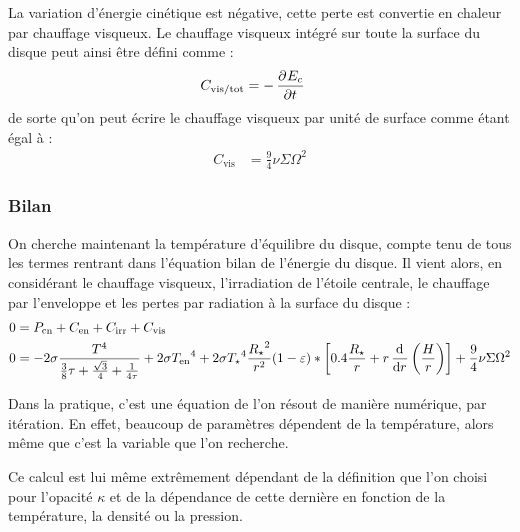 La variation d'énergie cinétique est négative, cette perte est convertie en chaleur par chauffage visqueux. Le chauffage visqueux intégré sur toute la surface du disque peut ainsi être défini comme : 
\begin{align*}
C_\text{vis/tot} &= - \mathinner{ \dfrac{\partial{^{}}E_c}{\partial{{t}^{}}} }
\end{align*}
de sorte qu'on peut écrire le chauffage visqueux par unité de surface comme étant égal à :
\begin{align}
C_\text{vis} &= \frac{9}{4} \nu\Sigma\Omega^2
\end{align}

\subsubsection{Bilan}
On cherche maintenant la température d'équilibre du disque, compte tenu de tous les termes rentrant dans l'équation bilan de l'énergie du disque. Il vient alors, en considérant le chauffage visqueux, l'irradiation de l'étoile centrale, le chauffage par l'enveloppe et les pertes par radiation à la surface du disque : 
\begin{align}
0 &= P_\text{cn} + C_\text{en} + C_\text{irr} + C_\text{vis}\nonumber\\
0 &= - 2\sigma \frac{T^4}{\frac{3}{8}\tau + \frac{\sqrt{3}}{4} + \inv{4\tau}} + 2 \sigma {T_\text{en}}^4 + 2 \sigma {T_\star}^4 \frac{{R_\star}^2}{r^2} (1-\varepsilon) * \left[0.4 \frac{R_\star}{r} + r \dod{}{r}\left(\frac{H}{r}\right)\right] + \frac{9}{4} \nu\Sigma\Omega^2\label{eq:equation_energie}
\end{align}

Dans la pratique, c'est une équation de l'on résout de manière numérique, par itération. En effet, beaucoup de paramètres dépendent de la température, alors même que c'est la variable que l'on recherche. 

Ce calcul est lui même extrêmement dépendant de la définition que l'on choisi pour l'opacité $\kappa$ et de la dépendance de cette dernière en fonction de la température, la densité ou la pression. 

